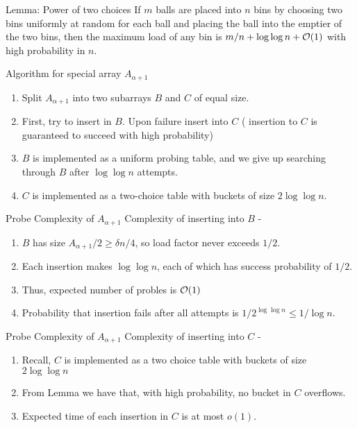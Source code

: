\documentclass{beamer}
\begin{document}
\begin{frame}
	\begin{block}{Lemma: Power of two choices}
		If $m$ balls are placed into $n$ bins by choosing two bins uniformly at random for each ball and placing the ball into the emptier of the two bins, then the maximum load of any bin is $m/n + \log{\log{n}} + {\cal O}(1)$ with high probability in $n$.
	\end{block}
\end{frame}

\begin{frame}{Algorithm for special array $A_{\alpha + 1}$}
	\begin{enumerate}
		\item Split $A_{\alpha + 1}$ into two subarrays $B$ and $C$ of equal size. 
		\item First, try to insert in $B$. Upon failure insert into $C$ ( insertion to $C$ is guaranteed to succeed with high probability)
		\item $B$ is implemented as a uniform probing table, and we give up searching through $B$ after $\log{\log{n}}$ attempts.
		\item $C$ is implemented as a two-choice table with buckets of size $2\log{\log{n}}$. 
	\end{enumerate}

\end{frame}

\begin{frame}{Probe Complexity of $A_{\alpha + 1}$}
	Complexity of inserting into $B$ - 
	\begin{enumerate}
		\item $B$ has size $A_{\alpha + 1}/2 \ge \delta n/4$, so load factor never exceeds $1/2$. 
		\item Each insertion makes $\log{\log{n}}$, each of which has success probability of $1/2$. 
		\item Thus, expected number of probles is ${\cal O}(1)$
		\item Probability that insertion fails after all attempts is $1/2^{\log{\log{n}}} \le 1/ \log{n}$.
	\end{enumerate}
\end{frame}

\begin{frame}{Probe Complexity of $A_{\alpha + 1}$}
	Complexity of inserting into $C$ - 
	\begin{enumerate}
		\item Recall, $C$ is implemented as a two choice table with buckets of size $2\log{\log{n}}$
		\item From Lemma we have that, with high probability, no bucket in $C$ overflows. 
		\item Expected time of each insertion in $C$ is at most $o(1)$.
	\end{enumerate}
\end{frame}
\end{document}
